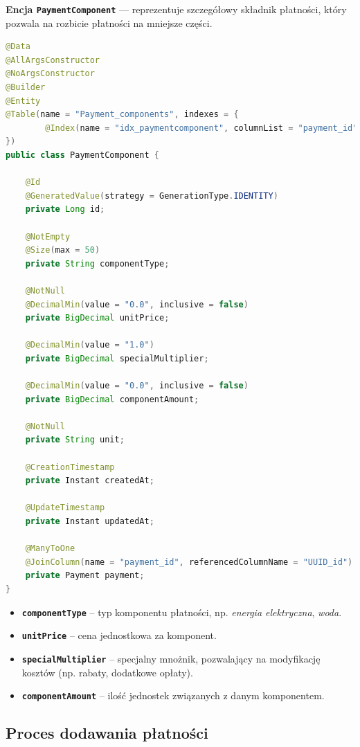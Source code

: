 \textbf{Encja \texttt{PaymentComponent}} --- reprezentuje szczegółowy składnik płatności, który pozwala na rozbicie płatności na mniejsze części.

\begin{lstlisting}[language=Java, caption=Kod encji \texttt{PaymentComponent}]
@Data
@AllArgsConstructor
@NoArgsConstructor
@Builder
@Entity
@Table(name = "Payment_components", indexes = {
        @Index(name = "idx_paymentcomponent", columnList = "payment_id")
})
public class PaymentComponent {

    @Id
    @GeneratedValue(strategy = GenerationType.IDENTITY)
    private Long id;

    @NotEmpty
    @Size(max = 50)
    private String componentType;

    @NotNull
    @DecimalMin(value = "0.0", inclusive = false)
    private BigDecimal unitPrice;

    @DecimalMin(value = "1.0")
    private BigDecimal specialMultiplier;

    @DecimalMin(value = "0.0", inclusive = false)
    private BigDecimal componentAmount;

    @NotNull
    private String unit;

    @CreationTimestamp
    private Instant createdAt;

    @UpdateTimestamp
    private Instant updatedAt;

    @ManyToOne
    @JoinColumn(name = "payment_id", referencedColumnName = "UUID_id")
    private Payment payment;
}
\end{lstlisting}

\begin{itemize}
    \item \textbf{\texttt{componentType}} -- typ komponentu płatności, np. \emph{energia elektryczna}, \emph{woda}.
    \item \textbf{\texttt{unitPrice}} -- cena jednostkowa za komponent.
    \item \textbf{\texttt{specialMultiplier}} -- specjalny mnożnik, pozwalający na modyfikację kosztów (np. rabaty, dodatkowe opłaty).
    \item \textbf{\texttt{componentAmount}} -- ilość jednostek związanych z danym komponentem.
\end{itemize}

\subsection{Proces dodawania płatności}

